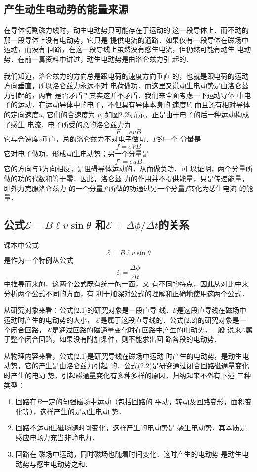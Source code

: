 \subsection{产生动生电动势的能量来源}

在导体切割磁力线时，动生电动势只可能存在于运动的
这一段导体上．而不动的那一段导体上没有电动势，它只是
提供电流的通路．如果仅有一段导体在磁场中运动，而没有
回路，在这一段导线上虽然没有感生电流，但仍然可能有动生
电动势．在前一篇资料中讲过，动生电动势是由洛仑兹力引
起的．


我们知道，洛仑兹力的方向总是跟电荷的速度方向垂直
的，也就是跟电荷的运动方向垂直，所以洛仑兹力永远不对
电荷做功．而这里又说动生电动势是由洛仑兹力引起的，两者
是否矛盾？其实这并不矛盾．我们来全面考虑一下运动导体
中电子的运动．在运动导体中的电子，不但具有导体本身的
速度$V$, 而且还有相对导体的定向速度$u$, 它们的合速度为
$v$, 如图2.25所示，正是由于电子的后一种运动构成了感生
电流．电子所受的总的洛仑兹力为
\[F=evB\]
它与合速度$v$垂直，总的洛仑兹力不对电子做功．$F$的一个
分量是
\[f=eVB\]
它对电子做功，形成动生电动势；另一个分量是
\[f'=euB\]
它的方向与$V$方向相反，是阻碍导体运动的，从而做负功．可
以证明，两个分量所做的功的代数和等于零．因此，洛仑兹
力的作用并不提供能量，只是传递能量，即外力克服洛仑兹力
的一个分量$f'$所做的功通过另一个分量$f$转化为感生电流
的能量．

\subsection{公式$\mathcal{E}=B\ell v\sin\theta$ 和$\mathcal{E}=\Delta\phi/\Delta t$的关系}
课本中公式
\begin{equation}
    \mathcal{E}=B\ell v\sin\theta
\end{equation}
是作为一个特例从公式
\begin{equation}
    \mathcal{E}=\frac{\Delta\phi}{\Delta t}
\end{equation}
中推导而来的．这两个公式既有统一的一面，又
有不同的特点，因此从对比中来分析两个公式不同的方面，有
利于加深对公式的理解和正确地使用这两个公式．

从研究对象来看：公式(2.1)的研究对象是一段直导
线．$\mathcal{E}$是这段直导线在磁场中运动时产生的电动势的大小，
$\mathcal{E}$是属于这段直导线的．公式(2.2)的研究对象是一个闭合回路，
$\mathcal{E}$是通过回路的磁通量变化时在回路中产生的电动势，一般
说来$\mathcal{E}$属于整个闭合回路，如果没有附加条件，则不能求出回
路各段的电动势．

从物理内容来看，公式(2.1)是研究导线在磁场中运动
时产生的电动势，是动生电动势，它的产生是由洛仑兹力引起
的．公式(2.2)是研究通过闭合回路磁通量变化时产生的电动
势，引起磁通量变化有多种多样的原因，归纳起来不外有下述
三种类型：
\begin{enumerate}
\item 回路在$B$一定的匀强磁场中运动（包括回路的
平动，转动及回路变形，面积变化等），这样产生的是动生电动
势．
\item 回路不运动但磁场随时间变化，这样产生的电动势是
感生电动势．其本质是感应电场力充当非静电力．
\item 回路在
磁场中运动，同时磁场也随着时间变化．这时产生的电动势
是动生电动势与感生电动势之和．
\end{enumerate}


